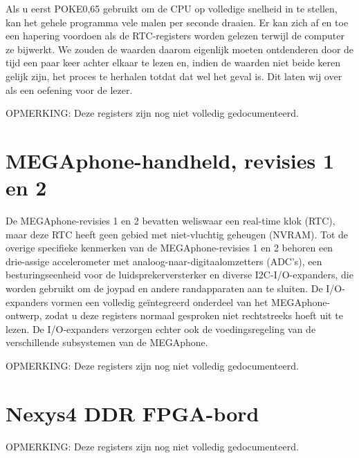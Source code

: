 Als u eerst POKE0,65 gebruikt om de CPU op volledige snelheid in te stellen, kan het gehele programma vele malen per seconde draaien. Er kan zich af en toe een hapering voordoen als de RTC-registers worden gelezen terwijl de computer ze bijwerkt. We zouden de waarden daarom eigenlijk moeten ontdenderen door de tijd een paar keer achter elkaar te lezen en, indien de waarden niet beide keren gelijk zijn, het proces te herhalen totdat dat wel het geval is. Dit laten wij over als een oefening voor de lezer.

OPMERKING: Deze registers zijn nog niet volledig gedocumenteerd.


\section{MEGAphone-handheld, revisies 1 en 2}

De MEGAphone-revisies 1 en 2 bevatten weliswaar een real-time klok (RTC), maar deze RTC heeft geen gebied met niet-vluchtig geheugen (NVRAM). Tot de overige specifieke kenmerken van de MEGAphone-revisies 1 en 2 behoren een drie-assige accelerometer met analoog-naar-digitaalomzetters (ADC's), een besturingseenheid voor de luidsprekerversterker en diverse I2C-I/O-expanders, die worden gebruikt om de joypad en andere randapparaten aan te sluiten. De I/O-expanders vormen een volledig geïntegreerd onderdeel van het MEGAphone-ontwerp, zodat u deze registers normaal gesproken niet rechtstreeks hoeft uit te lezen. De I/O-expanders verzorgen echter ook de voedingsregeling van de verschillende subsystemen van de MEGAphone.

OPMERKING: Deze registers zijn nog niet volledig gedocumenteerd.


\section{Nexys4 DDR FPGA-bord}

OPMERKING: Deze registers zijn nog niet volledig gedocumenteerd.


